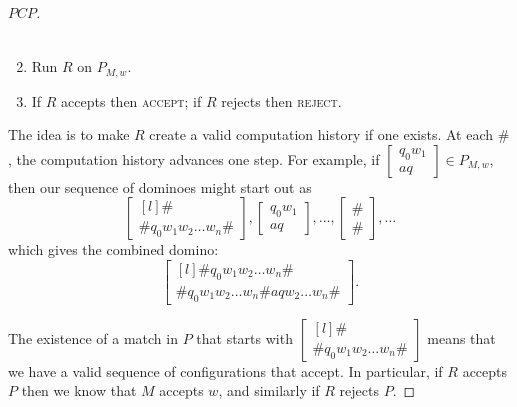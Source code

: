 \documentclass{standalone}
\begin{document}
\begin{proof}[\(\mathit{PCP}\)]
\begin{enumerate}[start=0]
\[\begin{multlined}
{        }
      \end{multlined}
    \]
    \item Run \(R\) on \(P_{M, w}\).
    \item If \(R\) accepts then \textsc{accept}; if \(R\) rejects then \textsc{reject}.
  \end{enumerate}
  The idea is to make \(R\) create a valid computation history if one exists. At each \(\texttt\#\), the computation history advances one step. For example, if \(\begin{bmatrix} q_0 w_1 \\ a q \end{bmatrix} \in P_{M, w}\), then our sequence of dominoes might start out as
  \[
    \begin{bmatrix*}[l] \texttt\# \\ \texttt\# q_0 w_1 w_2 \dots w_n \texttt\# \end{bmatrix*},
    \begin{bmatrix} q_0 w_1 \\ a q \end{bmatrix}, \dots,
    \begin{bmatrix} \texttt\# \\ \texttt\# \end{bmatrix}, \dots
  \]
  which gives the combined domino:
  \[
    \begin{bmatrix*}[l]
      \texttt\# q_0 w_1 w_2 \dots w_n \texttt\# \\
      \texttt\# q_0 w_1 w_2 \dots w_n \texttt\# a q w_2 \dots w_n \texttt\#
    \end{bmatrix*}.
  \]
  
  The existence of a match in \(P\) that starts with \(\begin{bmatrix*}[l] \texttt\# \\ \texttt\# q_0 w_1 w_2 \dots w_n \texttt\# \end{bmatrix*}\) means that we have a valid sequence of configurations that accept. In particular, if \(R\) accepts \(P\) then we know that \(M\) accepts \(w\), and similarly if \(R\) rejects \(P\).
\end{proof}
\end{document}
